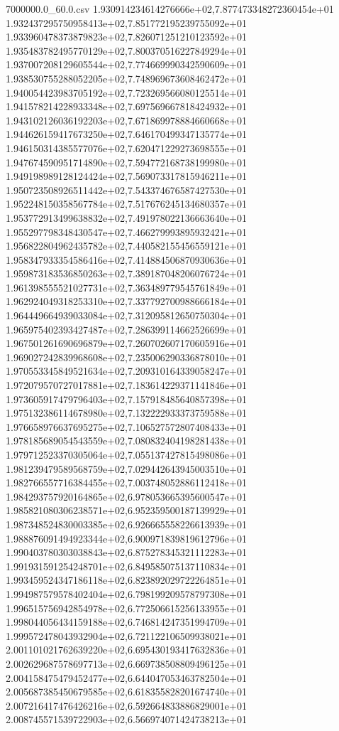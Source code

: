 \begin{filecontents*}{7000000.0_60.0.csv}
1.930914234614276666e+02,7.877473348272360454e+01
1.932437295750958413e+02,7.851772195239755092e+01
1.933960478373879823e+02,7.826071251210123592e+01
1.935483782495770129e+02,7.800370516227849294e+01
1.937007208129605544e+02,7.774669990342590609e+01
1.938530755288052205e+02,7.748969673608462472e+01
1.940054423983705192e+02,7.723269566080125514e+01
1.941578214228933348e+02,7.697569667818424932e+01
1.943102126036192203e+02,7.671869978884660668e+01
1.944626159417673250e+02,7.646170499347135774e+01
1.946150314385577076e+02,7.620471229273698555e+01
1.947674590951714890e+02,7.594772168738199980e+01
1.949198989128124424e+02,7.569073317815946211e+01
1.950723508926511442e+02,7.543374676587427530e+01
1.952248150358567784e+02,7.517676245134680357e+01
1.953772913499638832e+02,7.491978022136663640e+01
1.955297798348430547e+02,7.466279993895932421e+01
1.956822804962435782e+02,7.440582155456559121e+01
1.958347933354586416e+02,7.414884506870930636e+01
1.959873183536850263e+02,7.389187048206076724e+01
1.961398555521027731e+02,7.363489779545761849e+01
1.962924049318253310e+02,7.337792700988666184e+01
1.964449664939033084e+02,7.312095812650750304e+01
1.965975402393427487e+02,7.286399114662526699e+01
1.967501261690696879e+02,7.260702607170605916e+01
1.969027242839968608e+02,7.235006290336878010e+01
1.970553345849521634e+02,7.209310164339058247e+01
1.972079570727017881e+02,7.183614229371141846e+01
1.973605917479796403e+02,7.157918485640857398e+01
1.975132386114678980e+02,7.132222933373759588e+01
1.976658976637695275e+02,7.106527572807408433e+01
1.978185689054543559e+02,7.080832404198281438e+01
1.979712523370305064e+02,7.055137427815498086e+01
1.981239479589568759e+02,7.029442643945003510e+01
1.982766557716384455e+02,7.003748052886112418e+01
1.984293757920164865e+02,6.978053665395600547e+01
1.985821080306238571e+02,6.952359500187139929e+01
1.987348524830003385e+02,6.926665558226613939e+01
1.988876091494923344e+02,6.900971839819612796e+01
1.990403780303038843e+02,6.875278345321112283e+01
1.991931591254248701e+02,6.849585075137110834e+01
1.993459524347186118e+02,6.823892029722264851e+01
1.994987579578402404e+02,6.798199209578797308e+01
1.996515756942854978e+02,6.772506615256133955e+01
1.998044056434159188e+02,6.746814247351994709e+01
1.999572478043932904e+02,6.721122106509938021e+01
2.001101021762639220e+02,6.695430193417632836e+01
2.002629687578697713e+02,6.669738508809496125e+01
2.004158475479452477e+02,6.644047053463782504e+01
2.005687385450679585e+02,6.618355828201674740e+01
2.007216417476426216e+02,6.592664833886829001e+01
2.008745571539722903e+02,6.566974071424738213e+01

\end{filecontents*}
